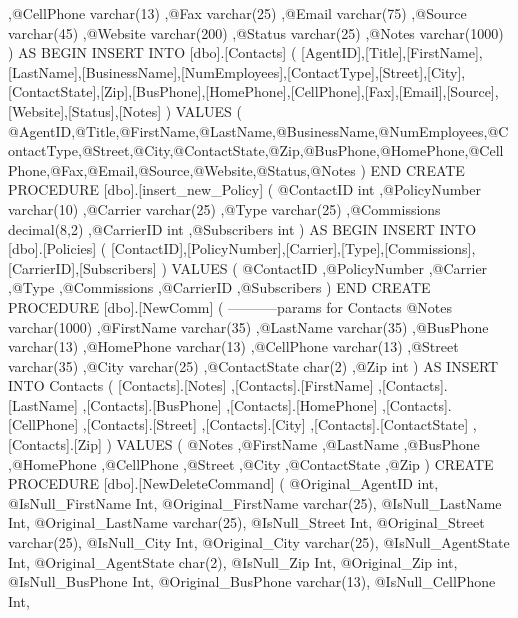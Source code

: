           ,@CellPhone varchar(13)			
           ,@Fax varchar(25)			
           ,@Email varchar(75)			
           ,@Source varchar(45)			
           ,@Website varchar(200)			
           ,@Status varchar(25)
		   ,@Notes varchar(1000)			
		   )	AS			BEGIN			
INSERT INTO [dbo].[Contacts]			
           (			
[AgentID],[Title],[FirstName],[LastName],[BusinessName],[NumEmployees],[ContactType],[Street],[City],[ContactState],[Zip],[BusPhone],[HomePhone],[CellPhone],[Fax],[Email],[Source],[Website],[Status],[Notes]			
		   )	
     VALUES			
           (			
@AgentID,@Title,@FirstName,@LastName,@BusinessName,@NumEmployees,@ContactType,@Street,@City,@ContactState,@Zip,@BusPhone,@HomePhone,@CellPhone,@Fax,@Email,@Source,@Website,@Status,@Notes 			
		   )		
END
CREATE PROCEDURE [dbo].[insert_new_Policy]
        (
		    @ContactID int
           ,@PolicyNumber varchar(10)
           ,@Carrier varchar(25)
           ,@Type varchar(25)
           ,@Commissions decimal(8,2)
           ,@CarrierID int
           ,@Subscribers int
		) AS BEGIN
	INSERT INTO [dbo].[Policies]
	(
	   [ContactID],[PolicyNumber],[Carrier],[Type],[Commissions],[CarrierID],[Subscribers]
	)
	 VALUES
		(
		    @ContactID
           ,@PolicyNumber 
           ,@Carrier 
           ,@Type 
           ,@Commissions 
           ,@CarrierID 
           ,@Subscribers
	    )
END
CREATE PROCEDURE [dbo].[NewComm]
			(
		   -----------params for Contacts
					@Notes varchar(1000)
					,@FirstName varchar(35)
					,@LastName varchar(35)
					,@BusPhone varchar(13)
					,@HomePhone varchar(13)
					,@CellPhone varchar(13)
					,@Street varchar(35)
					,@City varchar(25)
					,@ContactState char(2)
					,@Zip int
			) 
			AS
					INSERT INTO Contacts
			(
				[Contacts].[Notes]
				,[Contacts].[FirstName]
				,[Contacts].[LastName]
				,[Contacts].[BusPhone]
				,[Contacts].[HomePhone]
				,[Contacts].[CellPhone]
				,[Contacts].[Street]
				,[Contacts].[City]
				,[Contacts].[ContactState]
				,[Contacts].[Zip]
			)
	VALUES
			(	 
				@Notes 
				,@FirstName 
				,@LastName 
				,@BusPhone 
				,@HomePhone 
				,@CellPhone 
				,@Street
				,@City
				,@ContactState
				,@Zip
			)
CREATE PROCEDURE [dbo].[NewDeleteCommand]
(
	@Original_AgentID int,
	@IsNull_FirstName Int,
	@Original_FirstName varchar(25),
	@IsNull_LastName Int,
	@Original_LastName varchar(25),
	@IsNull_Street Int,
	@Original_Street varchar(25),
	@IsNull_City Int,
	@Original_City varchar(25),
	@IsNull_AgentState Int,
	@Original_AgentState char(2),
	@IsNull_Zip Int,
	@Original_Zip int,
	@IsNull_BusPhone Int,
	@Original_BusPhone varchar(13),
	@IsNull_CellPhone Int,
